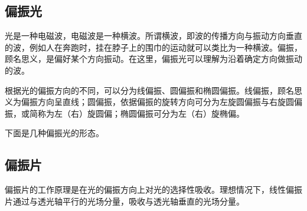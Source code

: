 
\begin{issues}
\issueDraft
\end{issues}


\subsection{偏振光}

光是一种电磁波，电磁波是一种横波。所谓横波，即波的传播方向与振动方向垂直的波，例如人在奔跑时，挂在脖子上的围巾的运动就可以类比为一种横波。偏振，顾名思义，是偏好某个方向振动。在这里，偏振光可以理解为沿着确定方向做振动的波。

根据光的偏振方向的不同，可以分为线偏振、圆偏振和椭圆偏振。线偏振，顾名思义为偏振方向呈直线；圆偏振，依据偏振的旋转方向可分为左旋圆偏振与右旋圆偏振，或简称为左（右）旋圆偏；椭圆偏振可分为左（右）旋椭偏。

下面是几种偏振光的形态。


\subsection{偏振片}
偏振片的工作原理是在光的偏振方向上对光的选择性吸收。理想情况下，线性偏振片通过与透光轴平行的光场分量，吸收与透光轴垂直的光场分量。

